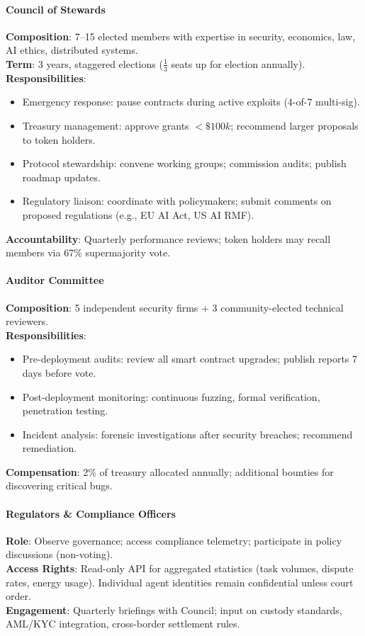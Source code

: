 \documentclass[11pt]{article}
\begin{document}
\paragraph{Council of Stewards}
\textbf{Composition}: 7--15 elected members with expertise in security, economics, law, AI ethics, distributed systems.\\
\textbf{Term}: 3 years, staggered elections ($\frac{1}{3}$ seats up for election annually).\\
\textbf{Responsibilities}:
\begin{itemize}[noitemsep]
  \item Emergency response: pause contracts during active exploits (4-of-7 multi-sig).
  \item Treasury management: approve grants $<\$100k$; recommend larger proposals to token holders.
  \item Protocol stewardship: convene working groups; commission audits; publish roadmap updates.
  \item Regulatory liaison: coordinate with policymakers; submit comments on proposed regulations (e.g., EU AI Act, US AI RMF).
\end{itemize}
\textbf{Accountability}: Quarterly performance reviews; token holders may recall members via 67\% supermajority vote.

\paragraph{Auditor Committee}
\textbf{Composition}: 5 independent security firms + 3 community-elected technical reviewers.\\
\textbf{Responsibilities}:
\begin{itemize}[noitemsep]
  \item Pre-deployment audits: review all smart contract upgrades; publish reports 7 days before vote.
  \item Post-deployment monitoring: continuous fuzzing, formal verification, penetration testing.
  \item Incident analysis: forensic investigations after security breaches; recommend remediation.
\end{itemize}
\textbf{Compensation}: 2\% of treasury allocated annually; additional bounties for discovering critical bugs.

\paragraph{Regulators \& Compliance Officers}
\textbf{Role}: Observe governance; access compliance telemetry; participate in policy discussions (non-voting).\\
\textbf{Access Rights}: Read-only API for aggregated statistics (task volumes, dispute rates, energy usage). Individual agent identities remain confidential unless court order.\\
\textbf{Engagement}: Quarterly briefings with Council; input on custody standards, AML/KYC integration, cross-border settlement rules.
\end{document}

